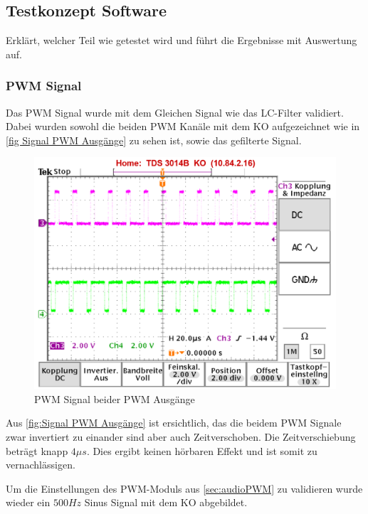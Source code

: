 \subsection{Testkonzept Software}\label{sec:testkonzeptSoftware}

Erklärt, welcher Teil wie getestet wird und führt die Ergebnisse mit Auswertung auf.

\subsubsection{PWM Signal}\label{sec: Validierung PWM Signal}
Das PWM Signal wurde mit dem Gleichen Signal wie das LC-Filter validiert. Dabei wurden sowohl die beiden PWM Kanäle mit dem KO aufgezeichnet wie in \autoref{fig Signal PWM Ausgänge} zu sehen ist, sowie das gefilterte Signal. 

\begin{figure}[ht!]
\center
\includegraphics[scale=1.0]{data/PWM_Signal_500Hz_Mono_mit_Infos.png}
\caption{PWM Signal beider PWM Ausgänge}
\label{fig:Signal PWM Ausgänge}
\end{figure}

Aus \autoref{fig:Signal PWM Ausgänge} ist ersichtlich, das die beidem PWM Signale zwar invertiert zu einander sind aber auch Zeitverschoben. Die Zeitverschiebung beträgt knapp $4\mu s$. Dies ergibt keinen hörbaren Effekt und ist somit zu vernachlässigen.

Um die Einstellungen des PWM-Moduls aus \ref{sec:audioPWM} zu validieren wurde wieder ein $500Hz$ Sinus Signal mit dem KO abgebildet.


